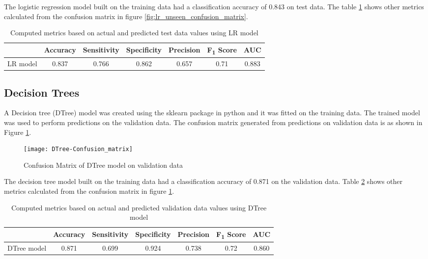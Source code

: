 \documentclass[11pt,openright]{report}
\begin{document}
The logistic regression model built on the training data had a classification accuracy of 0.843 on test data. The table \ref{table:lr-unseen_metrics_db} shows other metrics calculated from the confusion matrix in figure \ref{fig:lr_unseen_confusion_matrix}.

\begin{table}[!htb]
	\renewcommand{\arraystretch}{1.3}
	\caption{Computed metrics based on actual and predicted test data values using LR model}
	\label{table:lr-unseen_metrics_db}
	\centering
	\begin{tabular}{|c|c|c|c|c|c|c|}
    \hline
  	 & \bfseries Accuracy & \bfseries Sensitivity & \bfseries Specificity & \bfseries Precision & \bfseries F\textsubscript{1} Score  & \bfseries AUC\\  
    \hline
	LR model & 0.837 & 0.766 & 0.862 & 0.657 & 0.71 & 0.883 \\ \hline
	\end{tabular} 
\end{table}

\subsection {Decision Trees}
A Decision tree (DTree) model was created using the sklearn package in python and it was fitted on the training data. The trained model was used to perform predictions on the validation data. The confusion matrix generated from predictions on validation data is as shown in Figure \ref{fig:Dtree_confusion_matrix}.

  \begin{figure}[!htb]
	\centering
	\texttt{[image: DTree-Confusion\_matrix]}
	\caption{Confusion Matrix of DTree model on validation data}
	\label{fig:Dtree_confusion_matrix}
\end{figure} 

The decision tree model built on the training data had a classification accuracy of 0.871 on the validation data. Table \ref{table:Dtree_confusion_matrix} shows other metrics calculated from the confusion matrix in figure \ref{fig:Dtree_confusion_matrix}. 

\begin{table} [!htb]
	\renewcommand{\arraystretch}{1.3}
	\caption{Computed metrics based on actual and predicted validation data values using DTree model}
	\label{table:Dtree_confusion_matrix}
	\centering
	\begin{tabular}{|c|c|c|c|c|c|c|}
    \hline
  	 & \bfseries Accuracy & \bfseries Sensitivity & \bfseries Specificity & \bfseries Precision & \bfseries F\textsubscript{1} Score  & \bfseries AUC\\  
    \hline
	DTree model & 0.871 & 0.699 & 0.924 & 0.738 & 0.72 & 0.860 \\ \hline
	\end{tabular} 
\end{table}
\end{document}
